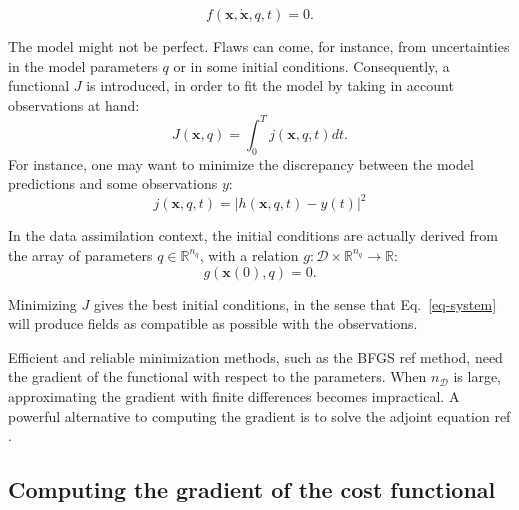 \documentclass[aip,pof,nofootinbib,reprint,onecolumn]{revtex4-1}
\newcommand{\todo}[1]{{\color{red} #1 }}
\newcommand{\gras}[1]{\boldsymbol{#1}}
\newcommand{\Ephaz}{\mathcal{D}}%
\newcommand{\Nphaz}{n_{\mathcal{D}}} %
\newcommand{\fdyn}{f} %
\newcommand{\costf}{J} %
\newcommand{\costff}{j} %
\newcommand{\obs}{y} %
\newcommand{\point}{\gras{x}} %
\begin{document}
\begin{equation}
\fdyn(\point,\dot{\point},q,t) =0.
\label{eq-system}
\end{equation} 

The model might not be perfect. Flaws can come, for instance, from
uncertainties in the model parameters $q$ or in some initial conditions.
Consequently, a functional $\costf$ is introduced, in order to fit the model
by taking in account observations at hand:
\begin{equation}
\costf(\point,q) = \int_0^T  \costff(\point,q,t) dt.
\label{eq-def_cost}
\end{equation} 
For instance, one may want to minimize the discrepancy between the model predictions and some observations $\obs$:
$$\costff(\point,q,t) = \left|h(\point,q,t) - \obs(t)\right|^2$$ 

In the data assimilation context, the initial conditions are actually derived from the array of parameters $q\in\mathbb{R}^{n_q}$, with a relation $g:\Ephaz\times\mathbb{R}^{n_q}\rightarrow\mathbb{R}$:
$$g(\point(0),q) = 0.$$

Minimizing $\costf$ gives the best initial conditions, in the sense that Eq.~\eqref{eq-system} will produce fields as compatible as possible with the observations.

Efficient and reliable minimization methods, such as the BFGS\todo{ref}
method, need the gradient of the functional with respect to the parameters.
When $\Nphaz$ is large, approximating the gradient with finite differences
becomes impractical. A powerful alternative to computing the gradient is to
solve the adjoint equation\todo{ref}.
\subsection{Computing the gradient of the cost functional}
\end{document}

